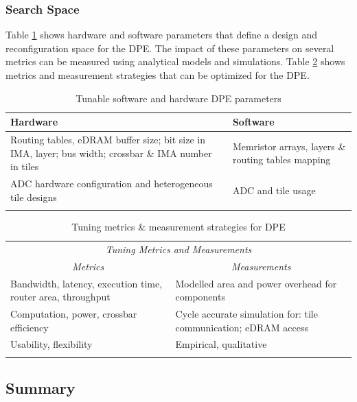 \subsubsection{Search Space}


Table \ref{tab:hard-soft-params} shows hardware and software parameters that
define a design and reconfiguration space for the DPE. The impact of these
parameters on several metrics can be measured using analytical models and
simulations.  Table \ref{tab:metrics-measurements} shows metrics and
measurement strategies that can be optimized for the DPE.

\begin{table}[htpb]
\centering
\begin{tabular}{@{}p{}p{}@{}}
\toprule
\textbf{Hardware} & \textbf{Software} \\ \midrule
Routing tables, eDRAM buffer size; bit size in IMA, layer; bus width; crossbar \& IMA number in tiles & Memristor arrays, layers \& routing tables mapping  \\
\addlinespace
ADC hardware configuration and heterogeneous tile designs & ADC and tile usage \\ \bottomrule
\addlinespace
\end{tabular}
\caption{Tunable software and hardware DPE parameters
}
\label{tab:hard-soft-params}
\end{table}

\begin{table}[htpb]
\centering
\begin{tabular}{@{}p{}p{}@{}}
\toprule
\multicolumn{2}{c}{\textit{Tuning Metrics and Measurements}} \\
\multicolumn{1}{c}{\textit{Metrics}} & \multicolumn{1}{c}{\textit{Measurements}} \\ \midrule
Bandwidth, latency, execution time, router area, throughput & Modelled area and power overhead for components \\
\addlinespace
Computation, power, crossbar efficiency & Cycle accurate simulation for: tile communication; eDRAM access \\
\addlinespace
Usability, flexibility & Empirical, qualitative \\ \bottomrule
\addlinespace
\end{tabular}
\caption{Tuning metrics \& measurement strategies for DPE}
\label{tab:metrics-measurements}
\end{table}


\subsection{Summary}
\label{subsec:DPEconcl}
